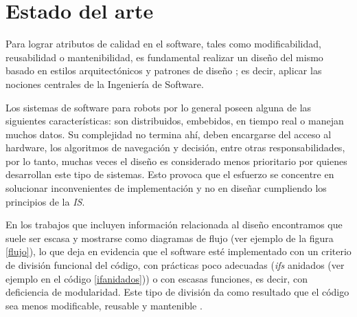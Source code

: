 %
%


\chapter{Estado del arte}
\label{estadoDelArte}


Para lograr atributos de calidad en el software, tales como modificabilidad, reusabilidad o mantenibilidad, es fundamental realizar un diseño del mismo basado en estilos arquitectónicos y patrones de diseño \cite{Gamma:1995:DPE:186897,shawgarlan,buschmann}; es decir, aplicar las nociones centrales de la Ingeniería de Software.

Los sistemas de software para robots por lo general poseen alguna de las siguientes características: son distribuidos, embebidos, en tiempo real o manejan muchos datos. Su complejidad no termina ahí, deben encargarse del acceso al hardware, los algoritmos de navegación y decisión, entre otras responsabilidades, por lo tanto, muchas veces el diseño es considerado menos prioritario por quienes desarrollan este tipo de sistemas. Esto provoca que el esfuerzo se concentre en solucionar inconvenientes de implementación y no en diseñar cumpliendo los principios de la \textit{IS}.

En los trabajos que incluyen información relacionada al diseño \cite{bad-desing-auto,bad-desing-implantable,code-1,code-2,Zhang2009,bad-design-uml,bad-design-robot} encontramos que suele ser escasa y mostrarse como diagramas de flujo (ver ejemplo de la figura \ref{flujo}), lo que deja en evidencia que el software esté implementado con un criterio de división funcional del código, con prácticas poco adecuadas (\textit{ifs} anidados (ver ejemplo en el código \ref{ifanidados})) o con escasas funciones, es decir, con deficiencia de modularidad. Este tipo de división da como resultado que el código sea menos modificable, reusable y mantenible \cite{parnas72}.

